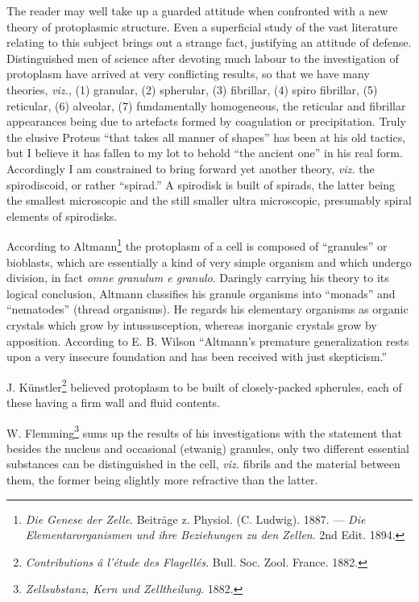 \documentclass[a4paper, 12pt, oneside]{article}
\begin{document}
The reader may well take up a guarded attitude when confronted with a new theory of protoplasmic structure. Even a superficial study of the vast literature relating to this subject brings out a strange fact, justifying an attitude of defense. Distinguished men of science after devoting much labour to the investigation of protoplasm have arrived at very conflicting results, so that we have many theories, \emph{viz.}, (1) granular, (2) spherular, (3) fibrillar, (4) spiro fibrillar, (5) reticular, (6) alveolar, (7) fundamentally homogeneous, the reticular and fibrillar appearances being due to artefacts formed by coagulation or precipitation. Truly the elusive Proteus ``that takes all manner of shapes'' has been at his old tactics, but I believe it has fallen to my lot to behold ``the ancient one'' in his real form. Accordingly I am constrained to bring forward yet another theory, \emph{viz.} the spirodiscoid, or rather ``spirad.'' A spirodisk is built of spirads, the latter being the smallest microscopic and the still smaller ultra microscopic, presumably spiral elements of spirodisks.

According to Altmann\footnote{\emph{Die Genese der Zelle}. Beiträge z. Physiol. (C. Ludwig). 1887. --- \emph{Die Elementarorganismen und ihre Beziehungen zu den Zellen}. 2nd Edit. 1894.} the protoplasm of a cell is composed of ``granules'' or bioblasts, which are essentially a kind of very simple organism and which undergo division, in fact \emph{omne granulum e granulo}. Daringly carrying his theory to its logical conclusion, Altmann classifies his granule organisms into ``monads'' and ``nematodes'' (thread organisms). He regards his elementary organisms as organic crystals which grow by intussusception, whereas inorganic crystals grow by apposition. According to E. B. Wilson ``Altmann's premature generalization rests upon a very insecure foundation and has been received with just skepticism.''

J. Künstler\footnote{\emph{Contributions â l'étude des Flagellés}. Bull. Soc. Zool. France. 1882.} believed protoplasm to be built of closely-packed spherules, each of these having a firm wall and fluid contents.

W. Flemming\footnote{\emph{Zellsubstanz, Kern und Zelltheilung}. 1882.} sums up the results of his investigations with the statement that besides the nucleus and occasional (etwanig) granules, only two different essential substances can be distinguished in the cell, \emph{viz.} fibrils and the material between them, the former being slightly more refractive than the latter.
\end{document}
